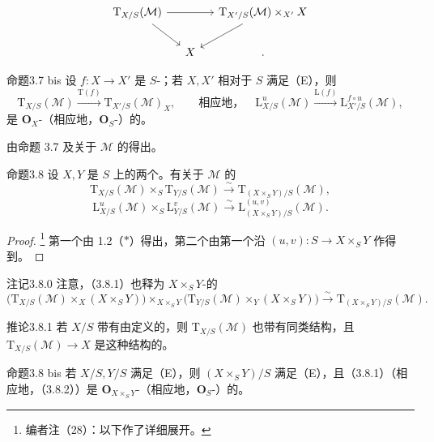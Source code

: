 \[
\begin{tikzcd}[column sep=small]
\mathrm T_{X/S}(\mathcal M)\arrow[rr]\arrow[dr]&&\mathrm T_{X'/S}(\mathcal M)\times_{X'}X\arrow[dl]\\
&X&.
\end{tikzcd}
\]
\begin{SGAresult}{命题}{3.7 bis}
设 $f:X\to X'$ 是 $S$-；若 $X,X'$ 相对于 $S$ 满足（E），则
\[
\mathrm T_{X/S}(\mathcal M)\xrightarrow{\mathrm T(f)}\mathrm T_{X'/S}(\mathcal M)_X,
\qquad\text{相应地，}\quad
\mathrm L^u_{X/S}(\mathcal M)\xrightarrow{\mathrm L(f)}\mathrm L^{f\circ u}_{X'/S}(\mathcal M),
\]
是 $\mathbf O_X$-（相应地，$\mathbf O_S$-）的。
\end{SGAresult}
由命题 3.7 及关于 $\mathcal M$ 的得出。
\begin{SGAresult}{命题}{3.8}
设 $X,Y$ 是 $S$ 上的两个。有关于 $\mathcal M$ 的
\[
\mathrm T_{X/S}(\mathcal M)\times_S\mathrm T_{Y/S}(\mathcal M)
\xrightarrow\sim\mathrm T_{(X\times_S Y)/S}(\mathcal M),\tag{3.8.1}
\]
\[
\mathrm L^u_{X/S}(\mathcal M)\times_S\mathrm L^v_{Y/S}(\mathcal M)
\xrightarrow\sim\mathrm L^{(u,v)}_{(X\times_S Y)/S}(\mathcal M).\tag{3.8.2}
\]
\end{SGAresult}
\begin{proof}
\footnote{编者注（28）：以下作了详细展开。} 第一个由 1.2（$*$）得出，第二个由第一个沿 $(u,v):S\to X\times_S Y$ 作得到。
\end{proof}
\begin{SGAresult}{注记}{3.8.0}
注意，（3.8.1）也释为 $X\times_S Y$-的
\[
\bigl(\mathrm T_{X/S}(\mathcal M)\times_X(X\times_S Y)\bigr)
\times_{X\times_S Y}
\bigl(\mathrm T_{Y/S}(\mathcal M)\times_Y(X\times_S Y)\bigr)
\xrightarrow\sim\mathrm T_{(X\times_S Y)/S}(\mathcal M).
\]
\end{SGAresult}
\begin{SGAresult}{推论}{3.8.1}
若 $X/S$ 带有由定义的，则 $\mathrm T_{X/S}(\mathcal M)$ 也带有同类结构，且 $\mathrm T_{X/S}(\mathcal M)\to X$ 是这种结构的。
\end{SGAresult}
\begin{SGAresult}{命题}{3.8 bis}
若 $X/S,Y/S$ 满足（E），则 $(X\times_S Y)/S$ 满足（E），且（3.8.1）（相应地，（3.8.2））是 $\mathbf O_{X\times_S Y}$-（相应地，$\mathbf O_S$-）的。
\end{SGAresult}
